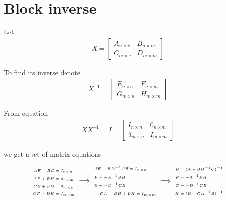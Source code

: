 \section{Block inverse}

Let 
\begin{align}
	X = \begin{bmatrix}
		A_{n \times n} & B_{n \times m} \\
		C_{m \times n} & D_{m \times m}
	\end{bmatrix}
\end{align}

To find its inverse denote 
\begin{align}
	X^{-1} = \begin{bmatrix}
		E_{n \times n} & F_{n \times m} \\
		G_{m \times n} & H_{m \times m}
	\end{bmatrix}
\end{align}

From equation 
\begin{align}\label{eq:block_inverse_right}
	X X^{-1} = I = \begin{bmatrix}
		I_{n \times n} & 0_{n \times m} \\
		0_{m \times n} & I_{m \times m}
			\end{bmatrix}
\end{align}

we get a set of matrix equations


\begin{align*}
\begin{tiny}
	\begin{aligned}
	A E + B G &= I_{n \times n} \\
	A F + B H &= 0_{n \times m} \\
	C E + D G &= 0_{m \times n} \\
	C F + D H &= I_{m \times m}
	\end{aligned}
\implies
	\begin{aligned}
	&A E - B D^{-1} C E = I_{n \times n} \\
	&F = -A^{-1} B H \\
	&G = -D^{-1} C E \\
	&-C A^{-1} B H + D H = I_{m \times m}
	\end{aligned}
\implies
	\begin{aligned}
	E &= (A - B D^{-1} C)^{-1} \\
	F &= -A^{-1} B H \\
	G &= -D^{-1} C E \\
	H &= (D - C A^{-1} B)^{-1}
	\end{aligned}
\end{tiny}
\end{align*}

